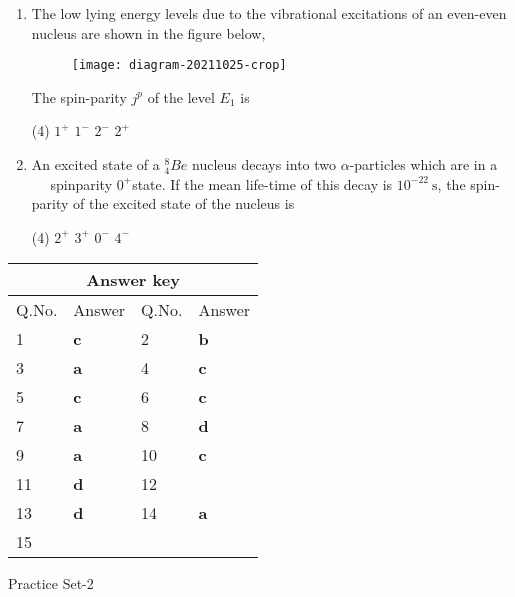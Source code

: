 \begin{enumerate}
\begin{tasks}
\end{tasks}
	\item  The low lying energy levels due to the vibrational excitations of an even-even nucleus are shown in the figure below,
		\begin{figure}[H]
		\centering
		\texttt{[image: diagram-20211025-crop]}
	\end{figure}
	The spin-parity $j^p$ of the level $E_1$ is
	{}
 \begin{tasks}(4)
	\task[\textbf{a.}]$1^{+}$
	\task[\textbf{b.}]$1^{-}$
	\task[\textbf{c.}]$2^{-}$
	\task[\textbf{d.}]$2^{+}$ 
\end{tasks}
	 \item  An excited state of a ${ }_4^8 B e$ nucleus decays into two $\alpha$-particles which are in a $\quad$ spinparity $0^{+}$state. If the mean life-time of this decay is $10^{-22} \mathrm{~s}$, the spin-parity of the excited state of the nucleus is
	 \begin{tasks}(4)
		\task[\textbf{a.}]$2^{+}$
		\task[\textbf{b.}]$3^{+}$
		\task[\textbf{c.}]$0^{-}$
		\task[\textbf{d.}]$4^{-}$ 
	\end{tasks}
\end{enumerate}
\setlength\arrayrulewidth{1pt}
\begin{table}[H]
	\centering
	\begin{tabular}{|p{1.5cm}|p{1.5cm}||p{1.5cm}|p{1.5cm}|}
		\hline
		\multicolumn{4}{|c|}{\textbf{Answer key}}\\\hline\hline
		\rowcolor{ocrel}Q.No.&Answer&Q.No.&Answer\\\hline
		1&\textbf{c} &2&\textbf{b}\\\hline 
		3&\textbf{a} &4&\textbf{c} \\\hline
		5&\textbf{c} &6&\textbf{c} \\\hline
		7&\textbf{a}&8&\textbf{d}\\\hline
		9&\textbf{a}&10&\textbf{c}\\\hline
		11&\textbf{d} &12&\textbf{}\\\hline
		13&\textbf{d}&14&\textbf{a}\\\hline
		15&\textbf{}& &\\\hline
		
	\end{tabular}
\end{table}
\newpage
\begin{abox}
	Practice Set-2
	\end{abox}
